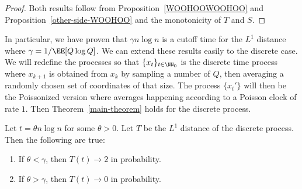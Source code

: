 \documentclass[12pt]{article}
\begin{document}
\begin{proof}
	Both results follow from Proposition~\ref{WOOHOOWOOHOO} and Proposition~\ref{other-side-WOOHOO} and the monotonicity of $T$ and $S$.
\end{proof}

In particular, we have proven that $\gamma n \log n$ is a cutoff time for the $L^1$ distance where $\gamma = 1/\EE[Q \log Q]$. We can extend these results easily to the discrete case. We will redefine the processes so that $\{x_t\}_{t \in \NN_0}$ is the discrete time process where $x_{k+1}$ is obtained from $x_k$ by sampling a number of $Q$, then averaging a randomly chosen set of coordinates of that size. The process $\{x_t'\}$ will then be the Poissonized version where averages happening according to a Poisson clock of rate $1$. Then Theorem~\ref{main-theorem} holds for the discrete process. 

\begin{thm} \label{main-theorem-discrete}
	Let $t = \theta n \log n$ for some $\theta > 0$. Let $T$ be the $L^1$ distance of the discrete process. Then the following are true:
	\begin{enumerate}[label = (\alph*)]
		\item If $\theta < \gamma$, then $T(t) \to 2$ in probability. 
		\item If $\theta > \gamma$, then $T(t) \to 0$ in probability. 
	\end{enumerate}
\end{thm}
\end{document}
